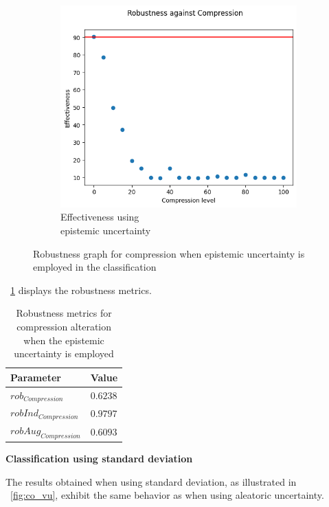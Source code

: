 \begin{figure}[H]
	\begin{subfigure}{.33\textwidth}
		\centering
		\includegraphics[width=0.9\linewidth]{ImageFiles/EvalBNN/CO/EU/eff}
		\caption{Effectiveness using \\ epistemic uncertainty}
		\label{fig:co_eu_eff}
	\end{subfigure}
	\caption{Robustness graph for compression when epistemic uncertainty is employed in the classification}
	\label{fig:co_eu}
\end{figure}

\Tab~\ref{table:rob_co_eu} displays the robustness metrics.

\begin{table}[H]
	\centering
	\begin{tabular}{|| l | l ||} 
		\hline
		\textbf{Parameter} & \textbf{Value} \\
		\hline
		\hline
		$rob_{Compression}$ & $0.6238$ \\
		$robInd_{Compression}$ & $0.9797$ \\
		$robAug_{Compression}$ & $0.6093$ \\	
		\hline
	\end{tabular}	
	\caption{Robustness metrics for compression alteration when the epistemic uncertainty is employed}
	\label{table:rob_co_eu}
\end{table}

\vspace{0.3cm}
\textbf{Classification using standard deviation}
\vspace{0.1cm}

The results obtained when using standard deviation, as illustrated in \Fig~\ref{fig:co_vu}, exhibit the same behavior as when using aleatoric uncertainty.

